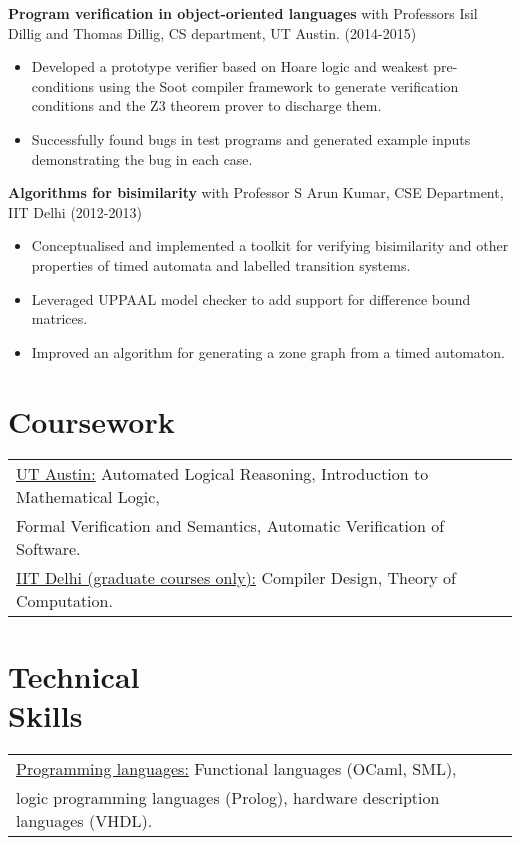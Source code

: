 \documentclass[margin]{res}
\begin{document}
\begin{resume}
 {\bf Program verification in object-oriented languages} with Professors Isil Dillig and Thomas
 Dillig, CS department, UT Austin. \hfill (2014-2015)
 \begin{itemize} \itemsep -2pt  %
 \item Developed a prototype verifier based on Hoare logic and weakest
   pre-conditions using the Soot compiler framework to generate
   verification conditions and the Z3 theorem prover to discharge them.
 \item Successfully found bugs in test programs and generated example
   inputs demonstrating the bug in each case.
 \end{itemize}

        {\bf Algorithms for bisimilarity} with Professor S
        Arun Kumar, CSE Department, IIT Delhi    \hfill
        (2012-2013) 
        \begin{itemize} \itemsep -2pt
        \item Conceptualised and implemented a toolkit for
          verifying bisimilarity and other properties of timed automata
          and labelled transition systems.
        \item Leveraged UPPAAL model checker to add support
          for difference bound matrices.
        \item Improved an algorithm for generating a zone
          graph from a timed automaton.

	\end{itemize}

\section{Coursework}
\begin{tabular}{l p{3in}}
  \underline{UT Austin:} Automated Logical Reasoning, Introduction to
  Mathematical Logic, \\ Formal Verification and Semantics, Automatic
  Verification of Software. \\
  \underline{IIT Delhi (graduate courses only):} Compiler Design,
  Theory of Computation.
\end{tabular}

\section{Technical \\ Skills}
   \begin{tabular}{l p{3in}}
    \underline{Programming languages:} Functional languages (OCaml,
    SML), \\ logic programming languages (Prolog),
    hardware description languages (VHDL). \\


\end{tabular}
\end{resume}
\end{document}
